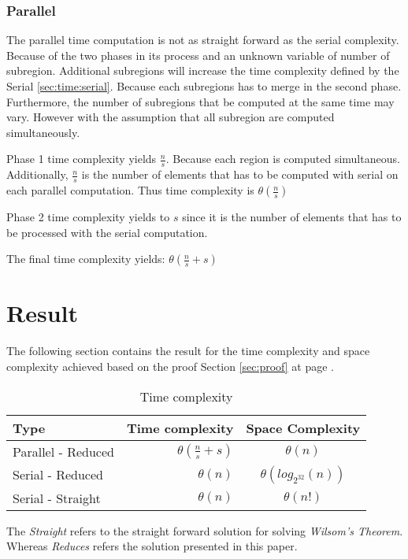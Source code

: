 \documentclass[12pt, oneside, onecolumn]{article}
\begin{document}
\subsubsection{Parallel}
The parallel time computation is not as straight forward as the serial complexity. Because of the two phases in its process and an unknown variable of number of subregion. Additional subregions will increase the time complexity defined by the Serial \ref{sec:time:serial}. Because each subregions has to merge in the second phase. Furthermore, the number of subregions that be computed at the same time may vary. However with the assumption that all subregion are computed simultaneously.

%
Phase 1 time complexity yields $\frac{n}{s}$. Because each region is computed simultaneous. Additionally, $\frac{n}{s}$ is the number of elements that has to be computed with serial    on each parallel computation. Thus time complexity is $\theta(\frac{n}{s})$

%
Phase 2 time complexity yields to $s$ since it is the number of elements that has to be processed with the serial computation.

The final time complexity yields: $\theta(\frac{n}{s} + s)$

\newpage
\section{Result}
The following section contains the result for the time complexity and space complexity achieved based on the proof Section \ref{sec:proof} at page \pageref{sec:proof}.

\begin{table}[!h]
\centering
\begin{tabular}{ | l | r | c | }
\hline
Type & Time complexity  & Space Complexity				 										\\ \hline
Parallel - Reduced 	& $\theta(\frac{n}{s} + s)$ 				& $\theta(n)$				  	\\ \hline
Serial - Reduced 	& $\theta(n)$ 								& $\theta(log_{2^{32}}(n))$	\\ \hline
Serial - Straight 	& $\theta(n)$ 								& $\theta(n!)$ 					\\ \hline
\end{tabular}
\caption{Time complexity}
\label{tab:res}
\end{table}
The \emph{Straight} refers to the straight forward solution for solving\emph{ Wilsom's Theorem}. Whereas \emph{Reduces} refers the solution presented in this paper.
\end{document}
